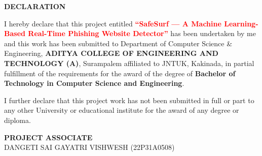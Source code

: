\begin{center}
{\bfseries\fontsize{16}{18}\selectfont DECLARATION}
\end{center}

\vspace{0.5cm}
\noindent
I hereby declare that this project entitled
\textbf{\textcolor{red}{``SafeSurf — A Machine Learning-Based Real-Time Phishing Website Detector''}}
has been undertaken by me and this work has been submitted to Department of Computer Science \& Engineering,
\textbf{ADITYA \newline COLLEGE OF ENGINEERING AND TECHNOLOGY (A)}, Surampalem affiliated to JNTUK, Kakinada,
in partial fulfillment of the requirements for the award of the degree of
\textbf{Bachelor of Technology in Computer Science and Engineering}.

\vspace{0.5cm}

\noindent
I further declare that this project work has not been submitted in full or part to any other University
or educational institute for the award of any degree or diploma.

\vspace{2cm}

\begin{flushright}
\textbf{PROJECT ASSOCIATE}\\[0.5cm]

DANGETI SAI GAYATRI VISHWESH (22P31A0508)
\end{flushright}